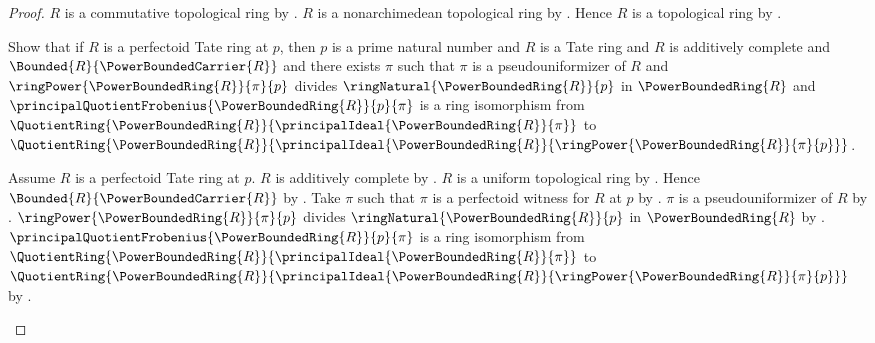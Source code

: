 \begin{proof}
    $R$ is a commutative topological ring by
        .
    $R$ is a nonarchimedean topological ring by
        .
    Hence $R$ is a topological ring by
        .

    Show that if $R$ is a perfectoid Tate ring at $p$, then
        $p$ is a prime natural number and
        $R$ is a Tate ring and
        $R$ is additively complete and
        $\Bounded{R}{\PowerBoundedCarrier{R}}$ and
        there exists $\pi$ such that
            $\pi$ is a pseudouniformizer of $R$ and
            $\ringPower{\PowerBoundedRing{R}}{\pi}{p}$ divides
                $\ringNatural{\PowerBoundedRing{R}}{p}$ in
                $\PowerBoundedRing{R}$ and
            $\principalQuotientFrobenius{
                    \PowerBoundedRing{R}}{p}{\pi}$
                is a ring isomorphism from
                $\QuotientRing{\PowerBoundedRing{R}}{
                    \principalIdeal{\PowerBoundedRing{R}}{\pi}}$ to
                $\QuotientRing{\PowerBoundedRing{R}}{
                    \principalIdeal{\PowerBoundedRing{R}}{
                        \ringPower{\PowerBoundedRing{R}}{\pi}{p}}}$.
    \begin{subproof}
        Assume $R$ is a perfectoid Tate ring at $p$.
        $R$ is additively complete by
            .
        $R$ is a uniform topological ring by
            .
        Hence $\Bounded{R}{\PowerBoundedCarrier{R}}$ by
            .
        Take $\pi$ such that $\pi$ is a perfectoid witness for $R$ at $p$
            by .
        $\pi$ is a pseudouniformizer of $R$ by
            .
        $\ringPower{\PowerBoundedRing{R}}{\pi}{p}$ divides
            $\ringNatural{\PowerBoundedRing{R}}{p}$ in
            $\PowerBoundedRing{R}$ by
            .
        $\principalQuotientFrobenius{
                \PowerBoundedRing{R}}{p}{\pi}$
            is a ring isomorphism from
            $\QuotientRing{\PowerBoundedRing{R}}{
                \principalIdeal{\PowerBoundedRing{R}}{\pi}}$ to
            $\QuotientRing{\PowerBoundedRing{R}}{
                \principalIdeal{\PowerBoundedRing{R}}{
                    \ringPower{\PowerBoundedRing{R}}{\pi}{p}}}$ by
            .
    \end{subproof}


\end{proof}
